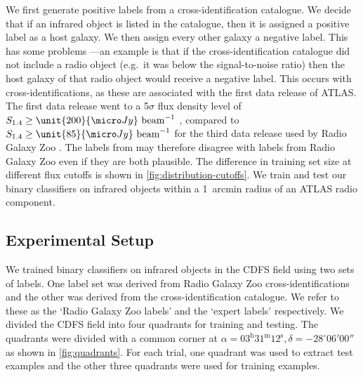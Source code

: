     We first generate positive labels from a cross-identification catalogue.
    We decide that if an infrared object is listed in the catalogue, then it
    is assigned a positive label as a host galaxy. We then assign every other galaxy a negative label. This has some problems
   ---an example is that if the cross-identification catalogue did not include a radio
    object (e.g.~it was below the signal-to-noise ratio) then the host galaxy
    of that radio object would receive a negative label. This occurs with
    \citet{norris06} cross-identifications, as these are associated with the
    first data release of ATLAS. The first data release went to a 5$\sigma$
    flux density level of $S_{1.4} \geq \unit{200}{\micro\jansky}\text{
    beam}^{-1}$ \citep{norris06}, compared to $S_{1.4} \geq \unit{85}{\micro\jansky}\text{
    beam}^{-1}$ for the third data release used by Radio Galaxy Zoo
    \citep{franzen15}. The labels from \citet{norris06} may therefore disagree with labels
    from Radio Galaxy Zoo even if they are both plausible. The difference in
    training set size at different flux cutoffs is shown in
    \autoref{fig:distribution-cutoffs}. We train and test our binary
    classifiers on infrared objects within a 1~arcmin radius of an ATLAS radio
    component.

  \subsection{Experimental Setup}
  \label{sec:atlas-xid-experimental-setup}

    We trained binary classifiers on infrared objects in the CDFS field using
    two sets of labels. One label set was derived from Radio Galaxy Zoo
    cross-identifications and the other was derived from the \citet{norris06}
    cross-identification catalogue. We refer to these as the `Radio Galaxy Zoo
    labels' and the `expert labels' respectively. We divided the CDFS field
    into four quadrants for training and testing. The quadrants were divided
    with a common corner at $\alpha = 03^\text{h}31^\text{m}12^\text{s},
    \delta = -28^\circ{}06'00''$ as shown in \autoref{fig:quadrants}. For
    each trial, one quadrant was used to extract test examples and the other
    three quadrants were used for training examples.

